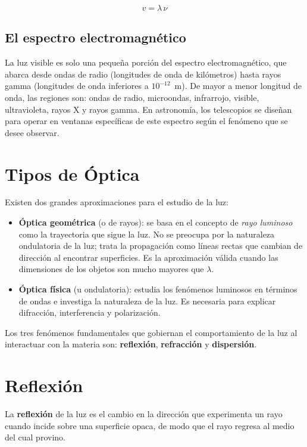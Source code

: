 $$v = \lambda\,\nu$$



\subsection{El espectro electromagnético}

La luz visible es solo una pequeña porción del espectro electromagnético, que abarca desde ondas de radio (longitudes de onda de kilómetros) hasta rayos gamma (longitudes de onda inferiores a $10^{-12}$~m). De mayor a menor longitud de onda, las regiones son: ondas de radio, microondas, infrarrojo, visible, ultravioleta, rayos X y rayos gamma. En astronomía, los telescopios se diseñan para operar en ventanas específicas de este espectro según el fenómeno que se desee observar.

\section{Tipos de Óptica}

Existen dos grandes aproximaciones para el estudio de la luz:

\begin{itemize}
    \item \textbf{Óptica geométrica} (o de rayos): se basa en el concepto de \textit{rayo luminoso} como la trayectoria que sigue la luz. No se preocupa por la naturaleza ondulatoria de la luz; trata la propagación como líneas rectas que cambian de dirección al encontrar superficies. Es la aproximación válida cuando las dimensiones de los objetos son mucho mayores que $\lambda$.
    \item \textbf{Óptica física} (u ondulatoria): estudia los fenómenos luminosos en términos de ondas e investiga la naturaleza de la luz. Es necesaria para explicar difracción, interferencia y polarización.
\end{itemize}

Los tres fenómenos fundamentales que gobiernan el comportamiento de la luz al interactuar con la materia son: \textbf{reflexión}, \textbf{refracción} y \textbf{dispersión}.

\section{Reflexión}

La \textbf{reflexión} de la luz es el cambio en la dirección que experimenta un rayo cuando incide sobre una superficie opaca, de modo que el rayo regresa al medio del cual provino.

